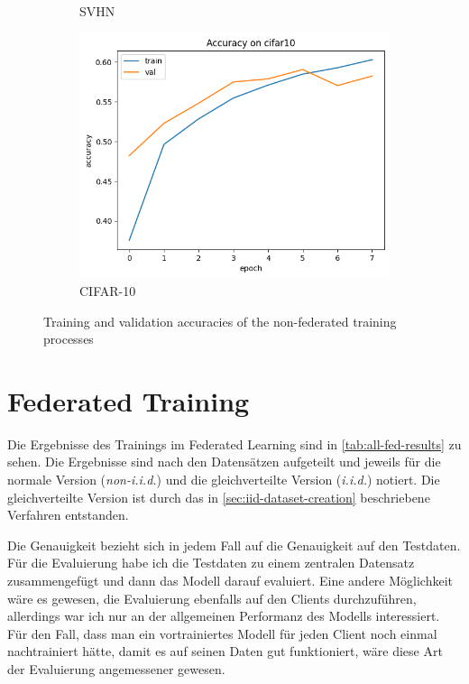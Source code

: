 \begin{figure}
\begin{subfigure}{0.3\textwidth}
		\caption{SVHN}
	\end{subfigure}
	\begin{subfigure}{0.3\textwidth}
		\centering
		\includegraphics[width=\textwidth]{Bilder/cifar-results-local.png}
		\caption{CIFAR-10}
	\end{subfigure}
	\caption{Training and validation accuracies of the non-federated training processes}
	\label{fig:local-training-histories}
\end{figure}

\section{Federated Training}\label{sec:fl-training-results}

Die Ergebnisse des Trainings im Federated Learning sind in \autoref{tab:all-fed-results} zu sehen. Die Ergebnisse sind nach den Datensätzen aufgeteilt und jeweils für die normale Version (\textit{non-i.i.d.}) und die gleichverteilte Version (\textit{i.i.d.}) notiert. Die gleichverteilte Version ist durch das in \autoref{sec:iid-dataset-creation} beschriebene Verfahren entstanden.

Die Genauigkeit bezieht sich in jedem Fall auf die Genauigkeit auf den Testdaten. Für die Evaluierung habe ich die Testdaten zu einem zentralen Datensatz zusammengefügt und dann das Modell darauf evaluiert. Eine andere Möglichkeit wäre es gewesen, die Evaluierung ebenfalls auf den Clients durchzuführen, allerdings war ich nur an der allgemeinen Performanz des Modells interessiert. Für den Fall, dass man ein vortrainiertes Modell für jeden Client noch einmal nachtrainiert hätte, damit es auf seinen Daten gut funktioniert, wäre diese Art der Evaluierung angemessener gewesen.

